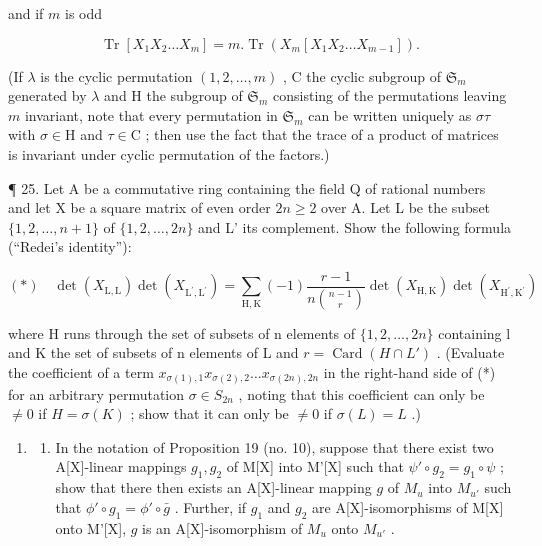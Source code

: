 and if \(m\) is odd

\[
\operatorname{Tr} \left[ X _ {1} X _ {2} \dots X _ {m} \right] = m. \operatorname{Tr} \left(X _ {m} \left[ X _ {1} X _ {2} \dots X _ {m - 1} \right]\right).
\]

(If \(\lambda\) is the cyclic permutation \((1,2,\ldots,m)\) , C the cyclic subgroup of \(\mathfrak{S}_m\) generated by \(\lambda\) and H the subgroup of \(\mathfrak{S}_m\) consisting of the permutations leaving \(m\) invariant, note that every permutation in \(\mathfrak{S}_m\) can be written uniquely as \(\sigma\tau\) with \(\sigma\in\mathrm{H}\) and \(\tau\in\mathrm{C}\) ; then use the fact that the trace of a product of matrices is invariant under cyclic permutation of the factors.)

¶ 25. Let A be a commutative ring containing the field Q of rational numbers and let X be a square matrix of even order \(2n \geqslant 2\) over A. Let L be the subset \(\{1, 2, \ldots, n + 1\}\) of \(\{1, 2, \ldots, 2n\}\) and L' its complement. Show the following formula (``Redei's identity''):

\[
(*) \quad \det (X _ {\mathrm{L}, \mathrm{L}}) \det (X _ {\mathrm{L} ^ {\prime}, \mathrm{L} ^ {\prime}}) = \sum_ {\mathrm{H}, \mathrm{K}} (- 1) \frac {r - 1}{n \binom {n - 1} {r}} \det (X _ {\mathrm{H}, \mathrm{K}}) \det (X _ {\mathrm{H} ^ {\prime}, \mathrm{K} ^ {\prime}})
\]

where H runs through the set of subsets of n elements of \(\{1,2,\ldots,2n\}\) containing l and K the set of subsets of n elements of L and \(r=\operatorname{Card}(H\cap L')\) . (Evaluate the coefficient of a term \(x_{\sigma(1),1}x_{\sigma(2),2}\ldots x_{\sigma(2n),2n}\) in the right-hand side of (*) for an arbitrary permutation \(\sigma\in S_{2n}\) , noting that this coefficient can only be \(\neq0\) if \(H=\sigma(K)\) ; show that it can only be \(\neq0\) if \(\sigma(L)=L\) .)

\begin{enumerate}
\def\labelenumi{\arabic{enumi}.}
\setcounter{enumi}{25}
\tightlist
\item
  \begin{enumerate}
  \def\labelenumii{(\alph{enumii})}
  \tightlist
  \item
    In the notation of Proposition 19 (no. 10), suppose that there exist two A{[}X{]}-linear mappings \(g_1, g_2\) of M{[}X{]} into M'{[}X{]} such that \(\psi' \circ g_2 = g_1 \circ \psi\) ; show that there then exists an A{[}X{]}-linear mapping \(g\) of \(M_u\) into \(M_{u'}\) such that \(\phi' \circ g_1 = \phi' \circ \bar{g}\) . Further, if \(g_1\) and \(g_2\) are A{[}X{]}-isomorphisms of M{[}X{]} onto M'{[}X{]}, \(g\) is an A{[}X{]}-isomorphism of \(M_u\) onto \(M_{u'}\) .
  \end{enumerate}
\end{enumerate}

